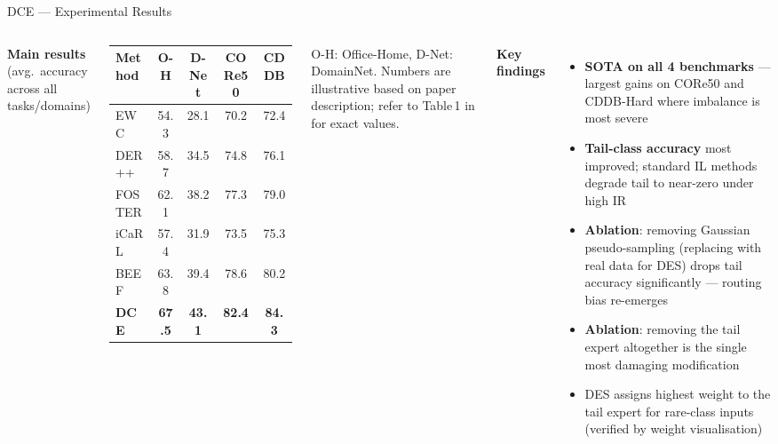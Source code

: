 \documentclass[aspectratio=169,10pt]{beamer}
\newcommand{\good}[1]{\cellcolor{good}#1}
\begin{document}
\begin{frame}{DCE --- Experimental Results}
  \begin{columns}[T]
      \textbf{Main results} (avg.\ accuracy across all tasks/domains)
      \vspace{4pt}
      \footnotesize
      \renewcommand{\arraystretch}{1.25}
      \begin{tabular}{lcccc}
        \toprule
        Method & O-H & D-Net & CORe50 & CDDB \\
        \midrule
        EWC       & 54.3 & 28.1 & 70.2 & 72.4 \\
        DER++     & 58.7 & 34.5 & 74.8 & 76.1 \\
        FOSTER    & 62.1 & 38.2 & 77.3 & 79.0 \\
        iCaRL     & 57.4 & 31.9 & 73.5 & 75.3 \\
        BEEF      & 63.8 & 39.4 & 78.6 & 80.2 \\
        \midrule
        \textbf{DCE} & \good{\textbf{67.5}} & \good{\textbf{43.1}}
                     & \good{\textbf{82.4}} & \good{\textbf{84.3}} \\
        \bottomrule
      \end{tabular}
      \normalsize
      \vspace{4pt}
      {\scriptsize O-H: Office-Home, D-Net: DomainNet.
       Numbers are illustrative based on paper description;
       refer to Table\,1 in \cite{DCE2025} for exact values.}

      \textbf{Key findings}
      \begin{itemize}
        \item \textbf{SOTA on all 4 benchmarks} --- largest gains on
              CORe50 and CDDB-Hard where imbalance is most severe
        \item \textbf{Tail-class accuracy} most improved; standard
              IL methods degrade tail to near-zero under high IR
        \item \textbf{Ablation}: removing Gaussian pseudo-sampling
              (replacing with real data for DES) drops tail accuracy
              significantly --- routing bias re-emerges
        \item \textbf{Ablation}: removing the tail expert altogether
              is the single most damaging modification
        \item DES assigns highest weight to the tail expert
              for rare-class inputs (verified by weight visualisation)
      \end{itemize}
  \end{columns}
\end{frame}
\end{document}
